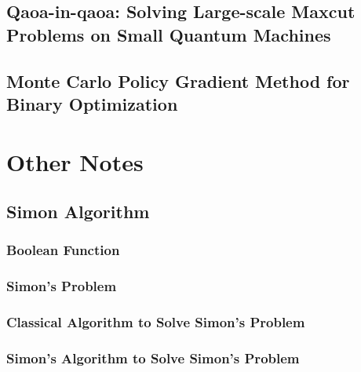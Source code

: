 \documentclass[
	11pt, %
	a4paper, %
]{LegrandOrangeBook}
\begin{document}
\chapter{Qaoa-in-qaoa: Solving Large-scale Maxcut Problems on Small Quantum Machines}


\chapter{Monte Carlo Policy Gradient Method for Binary Optimization}


%


\part{Other Notes}

\chapter{Simon Algorithm}

    \section{Boolean Function}
    

    \section{Simon's Problem}
    

    \section{Classical Algorithm to Solve Simon's Problem}
    

    \section{Simon's Algorithm to Solve Simon's Problem}
    
\end{document}
